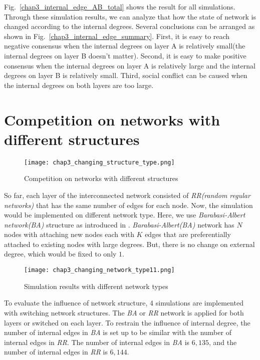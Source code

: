 Fig.~\ref{chap3_internal_edge_AB_total} shows the result for all simulations. Through these simulation results, we can analyze that how the state of network is changed according to the internal degrees. Several conclusions can be arranged as shown in Fig.~\ref{chap3_internal_edge_summary}.  First, it is easy to reach negative consensus when the internal degrees on layer A is relatively small(the internal degrees on layer B doesn't matter). Second, it is easy to make positive consensus when the internal degrees on layer A is relatively large and the internal degrees on layer B is relatively small. Third, social conflict can be caused when the internal degrees on both layers are too large. \\ 

\section{Competition on networks with different structures}
\begin{figure}[!htb]
	\centering
	\texttt{[image: chap3\_changing\_structure\_type.png]}
	\caption{Competition on networks with different structures}
	\label{chap3_changing_structure_type}
\end{figure}
So far, each layer of the interconnected network consisted of \textit{RR(random regular networks)} that has the same number of edges for each node. Now, the simulation would be implemented on different network type. Here, we use \textit{Barabasi-Albert network(BA)} structure as introduced in \parencite{barabasi1999}. \textit{Barabasi-Albert(BA)} network has $N$ nodes with attaching new nodes each with $K$ edges that are preferentially attached to existing nodes with large degrees. But, there is no change on external degree, which would be fixed to only $1$.
\begin{figure}[!htb]
	\centering
	\texttt{[image: chap3\_changing\_network\_type11.png]}
	\caption{Simulation results with different network types}
	\label{chap3_changing_network_type1}
\end{figure}
To evaluate the influence of network structure, 4 simulations are implemented with switching network structures. The \textit{BA} or \textit{RR} network is applied for both layers or switched on each layer. To restrain the influence of internal degree, the number of internal edges in \textit{BA} is set up to be similar with the number of internal edges in \textit{RR}. The number of internal edges in \textit{BA} is $6,135$, and the number of internal edges in \textit{RR} is $6,144$. \\
